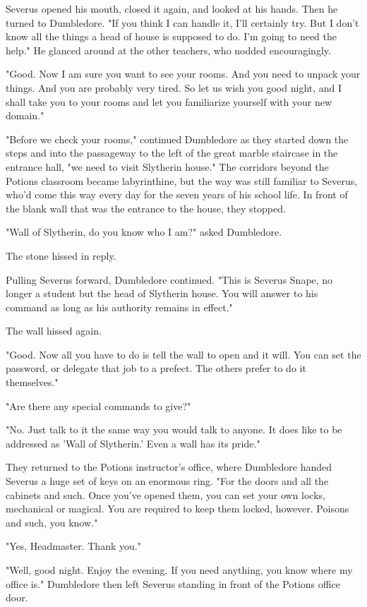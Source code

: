\documentclass[a4paper,11pt]{article}
\begin{document}
Severus opened his mouth, closed it again, and looked at his hands. Then he turned to Dumbledore. "If you think I can handle it, I'll certainly try. But I don't know all the things a head of house is supposed to do. I'm going to need the help." He glanced around at the other teachers, who nodded encouragingly.

"Good. Now I am sure you want to see your rooms. And you need to unpack your things. And you are probably very tired. So let us wish you good night, and I shall take you to your rooms and let you familiarize yourself with your new domain."

"Before we check your rooms," continued Dumbledore as they started down the steps and into the passageway to the left of the great marble staircase in the entrance hall, "we need to visit Slytherin house." The corridors beyond the Potions classroom became labyrinthine, but the way was still familiar to Severus, who'd come this way every day for the seven years of his school life. In front of the blank wall that was the entrance to the house, they stopped.

"Wall of Slytherin, do you know who I am?" asked Dumbledore.

The stone hissed in reply.

Pulling Severus forward, Dumbledore continued. "This is Severus Snape, no longer a student but the head of Slytherin house. You will answer to his command as long as his authority remains in effect."

The wall hissed again.

"Good. Now all you have to do is tell the wall to open and it will. You can set the password, or delegate that job to a prefect. The others prefer to do it themselves."

"Are there any special commands to give?"

"No. Just talk to it the same way you would talk to anyone. It does like to be addressed as 'Wall of Slytherin.' Even a wall has its pride."

They returned to the Potions instructor's office, where Dumbledore handed Severus a huge set of keys on an enormous ring. "For the doors and all the cabinets and such. Once you've opened them, you can set your own locks, mechanical or magical. You are required to keep them locked, however. Poisons and such, you know."

"Yes, Headmaster. Thank you."

"Well, good night. Enjoy the evening. If you need anything, you know where my office is." Dumbledore then left Severus standing in front of the Potions office door.
\end{document}
